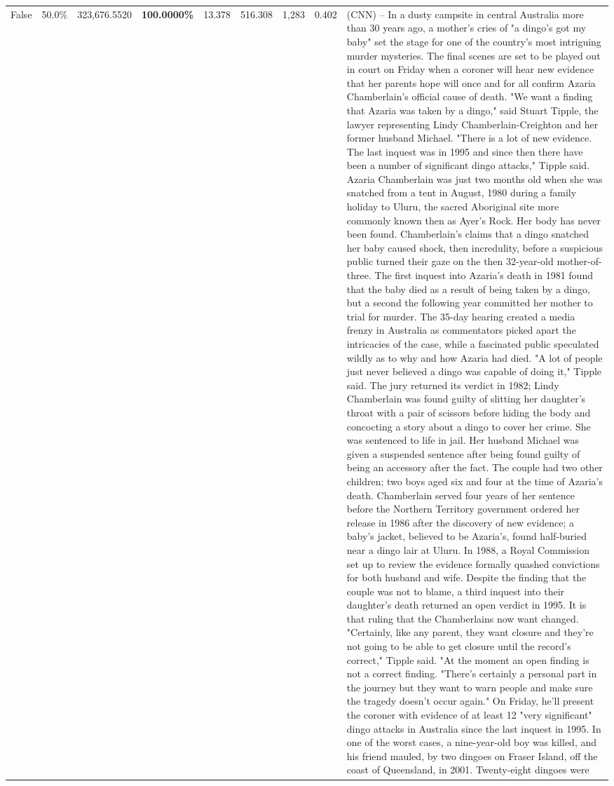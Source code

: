 \begin{table}[H]
\begin{tabular}{lllrlllll}
False & 50.0\% & 323,676.5520 & \bfseries \color{red} 100.0000\% & 13.378 & 516.308 & 1,283 & 0.402 & (CNN) -- In a dusty campsite in central Australia more than 30 years ago, a mother's cries of "a dingo's got my baby" set the stage for one of the country's most intriguing murder mysteries. The final scenes are set to be played out in court on Friday when a coroner will hear new evidence that her parents hope will once and for all confirm Azaria Chamberlain's official cause of death. "We want a finding that Azaria was taken by a dingo," said Stuart Tipple, the lawyer representing Lindy Chamberlain-Creighton and her former husband Michael. "There is a lot of new evidence. The last inquest was in 1995 and since then there have been a number of significant dingo attacks," Tipple said. Azaria Chamberlain was just two months old when she was snatched from a tent in August, 1980 during a family holiday to Uluru, the sacred Aboriginal site more commonly known then as Ayer's Rock. Her body has never been found. Chamberlain's claims that a dingo snatched her baby caused shock, then incredulity, before a suspicious public turned their gaze on the then 32-year-old mother-of-three. The first inquest into Azaria's death in 1981 found that the baby died as a result of being taken by a dingo, but a second the following year committed her mother to trial for murder. The 35-day hearing created a media frenzy in Australia as commentators picked apart the intricacies of the case, while a fascinated public speculated wildly as to why and how Azaria had died. "A lot of people just never believed a dingo was capable of doing it," Tipple said. The jury returned its verdict in 1982; Lindy Chamberlain was found guilty of slitting her daughter's throat with a pair of scissors before hiding the body and concocting a story about a dingo to cover her crime. She was sentenced to life in jail. Her husband Michael was given a suspended sentence after being found guilty of being an accessory after the fact. The couple had two other children; two boys aged six and four at the time of Azaria's death. Chamberlain served four years of her sentence before the Northern Territory government ordered her release in 1986 after the discovery of new evidence; a baby's jacket, believed to be Azaria's, found half-buried near a dingo lair at Uluru. In 1988, a Royal Commission set up to review the evidence formally quashed convictions for both husband and wife. Despite the finding that the couple was not to blame, a third inquest into their daughter's death returned an open verdict in 1995. It is that ruling that the Chamberlains now want changed. "Certainly, like any parent, they want closure and they're not going to be able to get closure until the record's correct," Tipple said. "At the moment an open finding is not a correct finding. "There's certainly a personal part in the journey but they want to warn people and make sure the tragedy doesn't occur again." On Friday, he'll present the coroner with evidence of at least 12 "very significant" dingo attacks in Australia since the last inquest in 1995. In one of the worst cases, a nine-year-old boy was killed, and his friend mauled, by two dingoes on Fraser Island, off the coast of Queensland, in 2001. Twenty-eight dingoes were 
\end{tabular}
\end{table}
